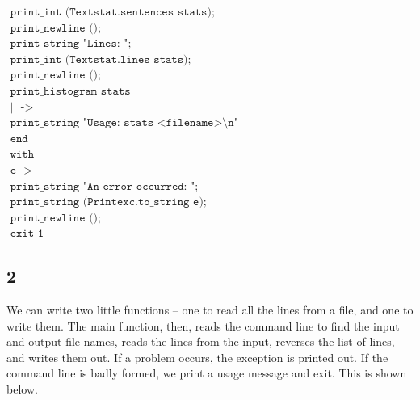 \documentclass[]{book}
\begin{document}
\begin{center}
{\begin{minipage}{0.9\textwidth}
$\texttt{\ \ \ \ \ \ \ \ \ \ print\_int (Textstat.sentences stats);}$\\
$\texttt{\ \ \ \ \ \ \ \ \ \ print\_newline ();}$\\
$\texttt{\ \ \ \ \ \ \ \ \ \ print\_string "Lines:\ ";}$\\
$\texttt{\ \ \ \ \ \ \ \ \ \ print\_int (Textstat.lines stats);}$\\
$\texttt{\ \ \ \ \ \ \ \ \ \ print\_newline ();}$\\
$\texttt{\ \ \ \ \ \ \ \ \ \ print\_histogram stats}$\\
$\texttt{\ \ \ \ | \_ ->}$\\
$\texttt{\ \ \ \ \ \ \ \ \ print\_string "Usage:\ stats <filename>\textbackslash n"}$\\
$\texttt{\ \ \ \ end}$\\
$\texttt{\ \ with}$\\
$\texttt{\ \ \ \ e ->}$\\
$\texttt{\ \ \ \ \ \ print\_string "An error occurred:\ ";}$\\
$\texttt{\ \ \ \ \ \ print\_string (Printexc.to\_string e);}$\\
$\texttt{\ \ \ \ \ \ print\_newline ()}$;\\
$\texttt{\ \ \ \ \ \ exit 1}$\vphantom{g}
\end{minipage}}
\end{center}

\subsection*{2}

We can write two little functions -- one to read all the lines from a file, and one to write them. The main function, then, reads the command line to find the input and output file names, reads the lines from the input, reverses the list of lines, and writes them out. If a problem occurs, the exception is printed out. If the command line is badly formed, we print a usage message and exit. This is shown below.
\end{document}
